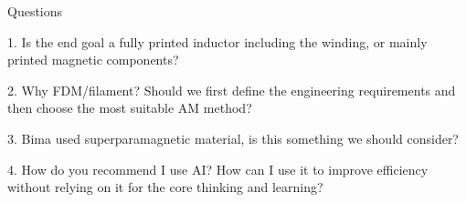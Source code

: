 \begin{frame}{Questions}

1. Is the end goal a fully printed inductor including the winding, or mainly printed magnetic components?

2. Why FDM/filament?
   Should we first define the engineering requirements and then choose the most suitable AM method?

3. Bima used superparamagnetic material, is this something we should consider?

4. How do you recommend I use AI?
   How can I use it to improve efficiency without relying on it for the core thinking and learning?
\end{frame}